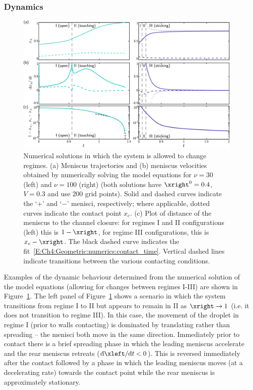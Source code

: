 \subsubsection{Dynamics}
\begin{figure}[h!]
\centering
\includegraphics[width=\textwidth]{touching_and_sticking_traces}
\caption{Numerical solutions in which the system is allowed to change regimes. (a) Meniscus trajectories and (b) meniscus velocities obtained by numerically solving the model equations for $\nu = 30$ (left) and $\nu  = 100$ (right) (both solutions have $\xright^0 = 0.4$, $V = 0.3$ and use $200$ grid points). Solid and dashed curves indicate the `$+$' and `$-$' menisci, respectively; where applicable, dotted curves indicate the contact point $x_c$. (c) Plot of distance of the meniscus to the channel closure: for regimes I and II configurations (left) this is $1 - \xright$, for regime III configurations, this is $x_c - \xright$. The black dashed curve indicates the fit~\eqref{E:Ch4:Geometric:numerics:contact_time}. Vertical dashed lines indicate transitions between the various contacting conditions.}\label{fig:Ch4:geometric:numerics}
\end{figure}

Examples of the dynamic behaviour determined from the numerical solution of the model equations (allowing for changes between regimes I-III) are shown in Figure~\ref{fig:Ch4:geometric:numerics}. The left panel of Figure~\ref{fig:Ch4:geometric:numerics} shows a scenario in which the system transitions from regime I to II but appears to remain in II as $\xright \to 1$ (i.e. it does not transition to regime III). In this case, the movement of the droplet in regime I (prior to walls contacting) is dominated by translating rather than spreading -- the menisci both move in the same direction. Immediately prior to contact there is a brief spreading phase in which the leading meniscus accelerate and the rear meniscus retreats ($\mathrm{d}\xleft/\mathrm{d}t < 0$). This is reversed immediately after the contact followed by a phase in which the leading meniscus moves (at a decelerating rate) towards the contact point while the rear meniscus is approximately stationary.

